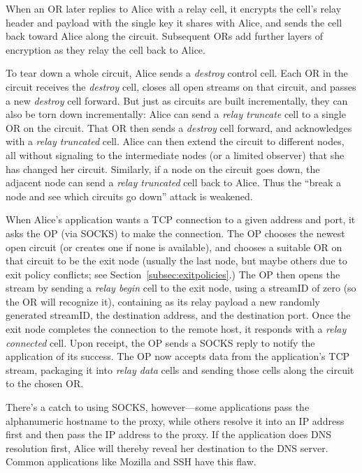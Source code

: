\documentclass[times,10pt,twocolumn]{article}
\begin{document}
When an OR later replies to Alice with a relay cell, it 
encrypts the cell's relay header and payload with the single key it
shares with Alice, and sends the cell back toward Alice along the
circuit.  Subsequent ORs add further layers of encryption as they
relay the cell back to Alice.

To tear down a whole circuit, Alice sends a \emph{destroy} control
cell. Each OR in the circuit receives the \emph{destroy} cell, closes
all open streams on that circuit, and passes a new \emph{destroy} cell
forward. But just as circuits are built incrementally, they can also
be torn down incrementally: Alice can send a \emph{relay
truncate} cell to a single OR on the circuit. That OR then sends a
\emph{destroy} cell forward, and acknowledges with a
\emph{relay truncated} cell. Alice can then extend the circuit to
different nodes, all without signaling to the intermediate nodes (or
a limited observer) that she has changed her circuit.
Similarly, if a node on the circuit goes down, the adjacent
node can send a \emph{relay truncated} cell back to Alice.  Thus the
``break a node and see which circuits go down'' attack
\cite{freedom21-security} is weakened.

\label{subsec:tcp}

When Alice's application wants a TCP connection to a given
address and port, it asks the OP (via SOCKS) to make the
connection. The OP chooses the newest open circuit (or creates one if
none is available), and chooses a suitable OR on that circuit to be the
exit node (usually the last node, but maybe others due to exit policy
conflicts; see Section~\ref{subsec:exitpolicies}.) The OP then opens
the stream by sending a \emph{relay begin} cell to the exit node,
using a streamID of zero (so the OR will recognize it), containing as
its relay payload a new randomly generated streamID, the destination
address, and the destination port.  Once the
exit node completes the connection to the remote host, it responds
with a \emph{relay connected} cell.  Upon receipt, the OP sends a
SOCKS reply to notify the application of its success. The OP
now accepts data from the application's TCP stream, packaging it into
\emph{relay data} cells and sending those cells along the circuit to
the chosen OR.

There's a catch to using SOCKS, however---some applications pass the
alphanumeric hostname to the proxy, while others resolve it into an IP
address first and then pass the IP address to the proxy.  If the
application does DNS resolution first, Alice will thereby
reveal her destination to the DNS server.  Common applications
like Mozilla and SSH have this flaw.
\end{document}
